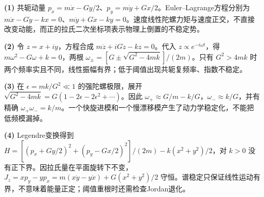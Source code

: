 \par\noindent\textbf{(1)} 共轭动量 \(p_x=m\dot x-Gy/2\)、\(p_y=m\dot y+Gx/2\)。Euler–Lagrange方程分别为 \(m\ddot x-G\dot y-kx=0\)、\(m\ddot y+G\dot x-ky=0\)。速度线性陀螺力矩与速度正交，不直接改变动能，而正的拉氏二次坐标项表示物理上倒置的不稳定势。
\par\noindent\textbf{(2)} 令 \(z=x+iy\)，方程合成 \(m\ddot z+iG\dot z-kz=0\)。代入 \(z\propto e^{-i\omega t}\)，得 \(m\omega^2-G\omega+k=0\)，两根 \(\omega_\pm=[G\pm\sqrt{G^2-4mk}]/(2m)\)。只有 \(G^2>4mk\) 时两个频率实且不同，线性振幅有界；低于阈值出现共轭复频率、指数不稳定。
\par\noindent\textbf{(3)} 在 \(\epsilon=mk/G^2\ll1\) 的强陀螺极限，展开 \(\sqrt{G^2-4mk}=G(1-2\epsilon-2\epsilon^2+\cdots)\)。因此 \(\omega_+\approx G/m-k/G\)，\(\omega_-\approx k/G\)，并有精确 \(\omega_+\omega_-=k/m\)。一个快旋进模和一个慢漂移模产生了动力学稳定化，不能把低频模漏掉。
\par\noindent\textbf{(4)} Legendre变换得到 \(H=[(p_x+Gy/2)^2+(p_y-Gx/2)^2]/(2m)-k(x^2+y^2)/2\)，对 \(k>0\) 没有正下界。因拉氏量在平面旋转下不变，\(J_z=xp_y-yp_x=m(x\dot y-y\dot x)+G(x^2+y^2)/2\) 守恒。谱稳定只保证线性运动有界，不意味着能量正定；阈值重根时还需检查Jordan退化。
